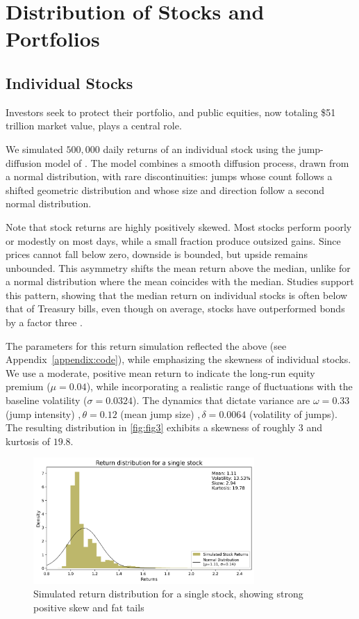 \section{Distribution of Stocks and Portfolios}

\subsection{Individual Stocks}
Investors seek to protect their portfolio, and public equities, now totaling \$51 trillion market value, plays a central role.

We simulated $500,000$ daily returns of an individual stock using the jump-diffusion model of \citet{backus2011disasters}. The model combines a smooth diffusion process, drawn from a normal distribution, with rare discontinuities: jumps whose count follows a shifted geometric distribution and whose size and direction follow a second normal distribution.

Note that stock returns are highly positively skewed. Most stocks perform poorly or modestly on most days, while a small fraction produce outsized gains. Since prices cannot fall below zero, downside is bounded, but upside remains unbounded. This asymmetry shifts the mean return above the median, unlike for a normal distribution where the mean coincides with the median. Studies support this pattern, showing that the median return on individual stocks is often below that of Treasury bills, even though on average, stocks have outperformed bonds by a factor three \citep{bessembinder2018stocks,oh2022cross}.

The parameters for this return simulation reflected the above (see Appendix~\ref{appendix:code}), while emphasizing the skewness of individual stocks. We use a moderate, positive mean return to indicate the long-run equity premium ($\mu = 0.04$), while incorporating a realistic range of fluctuations with the baseline volatility ($\sigma = 0.0324$). The dynamics that dictate variance are $\omega = 0.33$ (jump intensity) $, \theta = 0.12$ (mean jump size) $, \delta = 0.0064$ (volatility of jumps). The resulting distribution in \autoref{fig:fig3} exhibits a skewness of roughly $3$ and kurtosis of $19.8$. 


\begin{figure}[h]
    \centering
    \includegraphics[width=0.75\textwidth]{fig3.png}
    \caption{Simulated return distribution for a single stock, showing strong positive skew and fat tails}
    \label{fig:fig3}
\end{figure}

